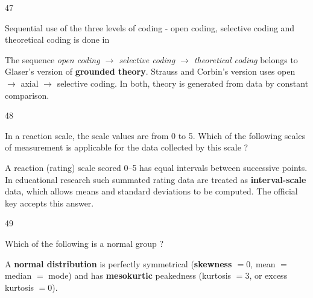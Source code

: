 \begin{question}{47}
{Sequential use of the three levels of coding - open coding, selective coding and theoretical coding is done in\par}
\begin{explain}
The sequence \emph{open coding $\rightarrow$ selective coding $\rightarrow$ theoretical coding} belongs to Glaser's version of \textbf{grounded theory}. Strauss and Corbin's version uses open $\rightarrow$ axial $\rightarrow$ selective coding. In both, theory is generated from data by constant comparison.
\end{explain}
\end{question}

\begin{question}{48}
{In a reaction scale, the scale values are from 0 to 5. Which of the following scales of measurement is applicable for the data collected by this scale ?\par}
\begin{explain}
A reaction (rating) scale scored 0--5 has equal intervals between successive points. In educational research such summated rating data are treated as \textbf{interval-scale} data, which allows means and standard deviations to be computed. The official key accepts this answer.
\end{explain}
\end{question}

\begin{question}{49}
{Which of the following is a normal group ?\par}
\begin{explain}
A \textbf{normal distribution} is perfectly symmetrical (\textbf{skewness $=0$}, mean $=$ median $=$ mode) and has \textbf{mesokurtic} peakedness (kurtosis $=3$, or excess kurtosis $=0$).
\end{explain}
\end{question}

